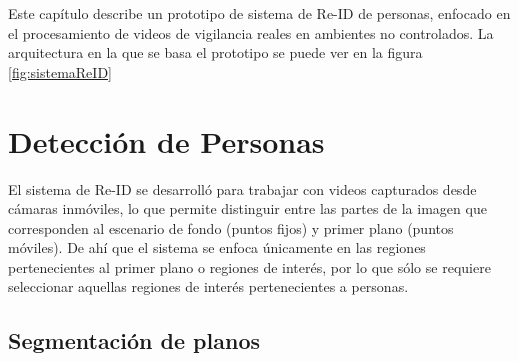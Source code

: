 \documentclass[../memoria.tex]{subfiles}
\begin{document}
\label{modelo desarrollado} 

Este capítulo describe un prototipo de sistema de Re-ID de personas, enfocado en el procesamiento de videos de vigilancia reales en ambientes no controlados. La arquitectura en la que se basa el prototipo se puede ver en la figura \ref{fig:sistemaReID}

\section{Detección de Personas}

El sistema de Re-ID se desarrolló para trabajar con videos capturados desde cámaras inmóviles, lo que permite distinguir entre las partes de la imagen que corresponden al escenario de fondo (puntos fijos) y primer plano (puntos móviles). De ahí que el sistema se enfoca únicamente en las regiones pertenecientes al primer plano o regiones de interés, por lo que sólo se requiere seleccionar aquellas regiones de interés pertenecientes a personas. %

\subsection{Segmentación de planos}
\label{segmentacion planos}
\end{document}
